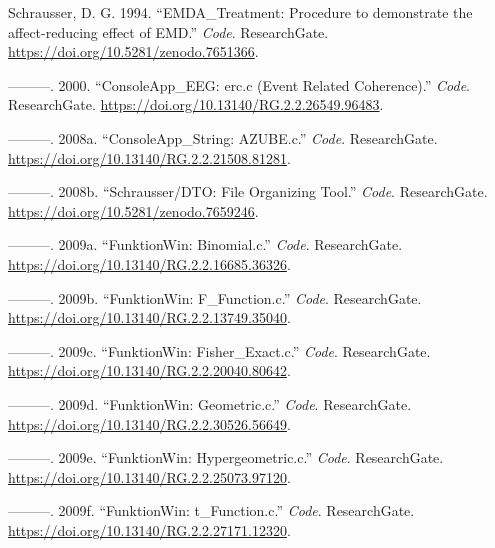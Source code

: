 \documentclass[
]{article}
\author{Dietmar Gerald SCHRAUSSER}
\date{14.04.2026}
\newlength{\cslhangindent}
\newlength{\cslentryspacingunit} %
\newenvironment{CSLReferences}[2] %
 {%
  \setlength{\parindent}{0pt}
  \ifodd #1
  \let\oldpar\par
  \def\par{\hangindent=\cslhangindent\oldpar}
  \fi
  \setlength{\parskip}{#2\cslentryspacingunit}
 }%
 {}
\begin{document}
\hypertarget{refs}{}
\begin{CSLReferences}{1}{0}
\leavevmode{}%
Schrausser, D. G. 1994. {``{EMDA\_Treatment: Procedure to demonstrate
the affect-reducing effect of EMD}.''} \emph{Code}. ResearchGate.
\url{https://doi.org/10.5281/zenodo.7651366}.

\leavevmode{}%
---------. 2000. {``{ConsoleApp\_EEG: erc.c (Event Related
Coherence)}.''} \emph{Code}. ResearchGate.
\url{https://doi.org/10.13140/RG.2.2.26549.96483}.

\leavevmode{}%
---------. 2008a. {``{ConsoleApp\_String: AZUBE.c}.''} \emph{Code}.
ResearchGate. \url{https://doi.org/10.13140/RG.2.2.21508.81281}.

\leavevmode{}%
---------. 2008b. {``{Schrausser/DTO: File Organizing Tool}.''}
\emph{Code}. ResearchGate. \url{https://doi.org/10.5281/zenodo.7659246}.

\leavevmode{}%
---------. 2009a. {``{FunktionWin: Binomial.c}.''} \emph{Code}.
ResearchGate. \url{https://doi.org/10.13140/RG.2.2.16685.36326}.

\leavevmode{}%
---------. 2009b. {``{FunktionWin: F\_Function.c}.''} \emph{Code}.
ResearchGate. \url{https://doi.org/10.13140/RG.2.2.13749.35040}.

\leavevmode{}%
---------. 2009c. {``{FunktionWin: Fisher\_Exact.c}.''} \emph{Code}.
ResearchGate. \url{https://doi.org/10.13140/RG.2.2.20040.80642}.

\leavevmode{}%
---------. 2009d. {``{FunktionWin: Geometric.c}.''} \emph{Code}.
ResearchGate. \url{https://doi.org/10.13140/RG.2.2.30526.56649}.

\leavevmode{}%
---------. 2009e. {``{FunktionWin: Hypergeometric.c}.''} \emph{Code}.
ResearchGate. \url{https://doi.org/10.13140/RG.2.2.25073.97120}.

\leavevmode{}%
---------. 2009f. {``{FunktionWin: t\_Function.c}.''} \emph{Code}.
ResearchGate. \url{https://doi.org/10.13140/RG.2.2.27171.12320}.


\end{CSLReferences}
\end{document}
